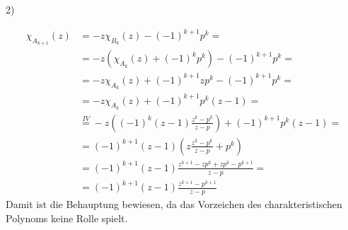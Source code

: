 \begin{paragraph}{2)}
\begin{itemize}
      \begin{equation*}
        \begin{split}
          \chi_{A_{k+1}}(z) &= -z \chi_{B_{k}}(z) - (-1)^{k+1}p^{k} = \\
          &= -z(\chi_{A_{k}}(z) + (-1)^{k}p^{k}) - (-1)^{k+1}p^{k} = \\
          &= -z \chi_{A_{k}}(z) + (-1)^{k+1}zp^{k} - (-1)^{k+1}p^{k} = \\
          &= -z \chi_{A_{k}}(z) + (-1)^{k+1}p^{k} (z - 1) = \\
          &\overset{IV}{=} -z ((-1)^{k}(z - 1)\frac{z^{k}-p^{k}}{z-p}) +
          (-1)^{k+1}p^{k}(z-1) = \\
          &= (-1)^{k+1} (z-1) (z \frac{z^{k}-p^{k}}{z-p} + p^{k}) \\
          &= (-1)^{k+1} (z-1) \frac{z^{k+1}-zp^{k}+zp^{k}-p^{k+1}}{z-p} = \\
          &= (-1)^{k+1} (z-1) \frac{z^{k+1}-p^{k+1}}{z-p} 
        \end{split}
      \end{equation*}
      Damit ist die Behauptung bewiesen, da das Vorzeichen des
      charakteristischen Polynoms keine Rolle spielt.


\end{itemize}
\end{paragraph}
